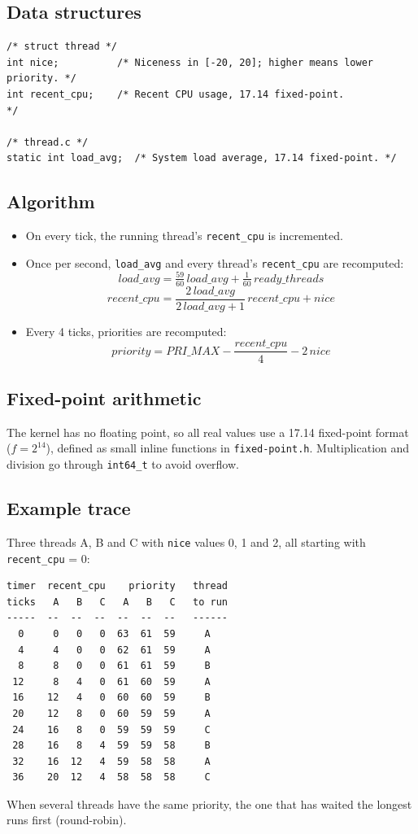 \documentclass[a4paper,11pt]{article}
\newcommand{\code}[1]{\texttt{#1}}
\begin{document}
\subsection*{Data structures}
\begin{Verbatim}[frame=single]
/* struct thread */
int nice;          /* Niceness in [-20, 20]; higher means lower priority. */
int recent_cpu;    /* Recent CPU usage, 17.14 fixed-point.                 */

/* thread.c */
static int load_avg;  /* System load average, 17.14 fixed-point. */
\end{Verbatim}

\subsection*{Algorithm}
\begin{itemize}
  \item On every tick, the running thread's \code{recent\_cpu} is incremented.
  \item Once per second, \code{load\_avg} and every thread's \code{recent\_cpu} are recomputed:
  \[ \mathit{load\_avg} = \tfrac{59}{60}\,\mathit{load\_avg} + \tfrac{1}{60}\,\mathit{ready\_threads} \]
  \[ \mathit{recent\_cpu} = \frac{2\,\mathit{load\_avg}}{2\,\mathit{load\_avg}+1}\,\mathit{recent\_cpu} + \mathit{nice} \]
  \item Every 4 ticks, priorities are recomputed:
  \[ \mathit{priority} = \mathit{PRI\_MAX} - \frac{\mathit{recent\_cpu}}{4} - 2\,\mathit{nice} \]
\end{itemize}

\subsection*{Fixed-point arithmetic}
The kernel has no floating point, so all real values use a 17.14 fixed-point format ($f = 2^{14}$), defined as small inline functions in \code{fixed-point.h}. Multiplication and division go through \code{int64\_t} to avoid overflow.

\subsection*{Example trace}
Three threads A, B and C with \code{nice} values 0, 1 and 2, all starting with \code{recent\_cpu} = 0:
\begin{Verbatim}[frame=single]
timer  recent_cpu    priority   thread
ticks   A   B   C   A   B   C   to run
-----  --  --  --  --  --  --   ------
  0     0   0   0  63  61  59     A
  4     4   0   0  62  61  59     A
  8     8   0   0  61  61  59     B
 12     8   4   0  61  60  59     A
 16    12   4   0  60  60  59     B
 20    12   8   0  60  59  59     A
 24    16   8   0  59  59  59     C
 28    16   8   4  59  59  58     B
 32    16  12   4  59  58  58     A
 36    20  12   4  58  58  58     C
\end{Verbatim}
When several threads have the same priority, the one that has waited the longest runs first (round-robin).
\end{document}
